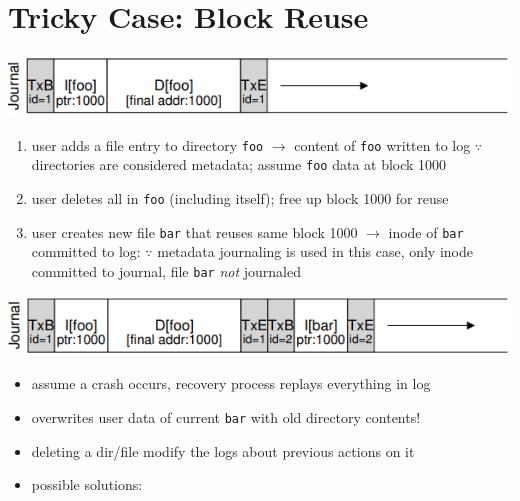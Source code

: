 \section*{Tricky Case: Block Reuse}
\includegraphics[width=\linewidth]{imgs/jn_tr1}
\begin{enumerate}
\item user adds a file entry to directory \texttt{foo} $\to$ content of \texttt{foo} written to log $\because$ directories are considered metadata; assume \texttt{foo} data at block 1000
\item user deletes all in \texttt{foo} (including itself); free up block 1000 for reuse
\item user creates new file \texttt{bar} that reuses same block 1000 $\to$ inode of \texttt{bar} committed to log: $\because$ metadata journaling is used in this case, only inode committed to journal, file \texttt{bar} \emph{not} journaled
\end{enumerate}
\includegraphics[width=\linewidth]{imgs/jn_tr2}
\begin{itemize}
\item assume a crash occurs, recovery process replays everything in log
\item overwrites user data of current \texttt{bar} with old directory contents!
\item deleting a dir/file  modify the logs about previous actions on it
\item possible solutions:
\end{itemize}
